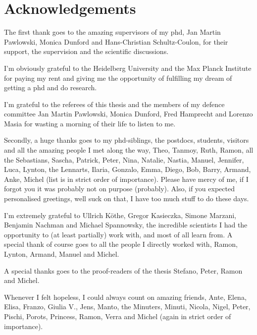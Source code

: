 \chapter{Acknowledgements}\label{chap:acknowledgements}
\enlargethispage{2ex}
\vspace*{-2pt}
\thispagestyle{empty}

The first thank goes to the amazing supervisors of my phd,  Jan Martin Pawlowski, Monica Dunford and Hans-Christian Schultz-Coulon, for their support, the supervision and the scientific discussions.

\medskip

I'm obviously grateful to the Heidelberg University and the Max Planck Institute for paying my rent and giving me the opportunity of fulfilling my dream of getting a phd and do research.

\medskip

I'm grateful to the referees of this thesis and the members of my defence committee Jan Martin Pawlowski, Monica Dunford, Fred Hamprecht and Lorenzo Masia for wasting a morning of their life to listen to me.

\medskip

Secondly, a huge thanks goes to my phd-siblings, the postdocs, students, visitors and all the amazing people I met along the way, Theo, Tanmoy, Ruth, Ramon, all the Sebastians, Sascha, Patrick, Peter, Nina, Natalie, Nastia, Manuel, Jennifer, Luca, Lynton, the Lennarts, Ilaria, Gonzalo, Emma, Diego, Bob, Barry, Armand, Anke, Michel (list is in strict order of importance). Please have mercy of me, if I forgot you it was probably not on purpose (probably). Also, if you expected personalised greetings, well suck on that, I have too much stuff to do these days.

\medskip

I'm extremely grateful to Ullrich Köthe, Gregor Kasieczka, Simone Marzani, Benjamin Nachman and Michael Spannowsky, the incredible scientists I had the opportunity to (at least partially) work with, and most of all learn from. A special thank of course goes to all the people I directly worked with, Ramon, Lynton, Armand, Manuel and Michel.

\medskip

A special thanks goes to the proof-readers of the thesis Stefano, Peter, Ramon and Michel.

\medskip

Whenever I felt hopeless, I could always count on amazing friends, Ante, Elena, Elisa, Franzo, Giulia V., Jens, Manto, the Minuters, Minuti, Nicola, Nigel, Peter, Pischi, Porots, Princess, Ramon, Verra and Michel (again in strict order of importance).

